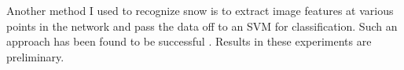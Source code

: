 \documentclass[25pt, a0paper, portrait, margin=0mm, innermargin=15mm,
     blockverticalspace=15mm, colspace=12mm, orientation=landscape]{tikzposter} %
\begin{document}
\begin{columns}
{\hspace{2em} Another method I used to recognize snow is to extract image features at various points in the network and pass the data off to an SVM for classification. Such an approach has been found to be successful \cite{features}. Results in these experiments are preliminary.
}
\end{columns}
\end{document}

